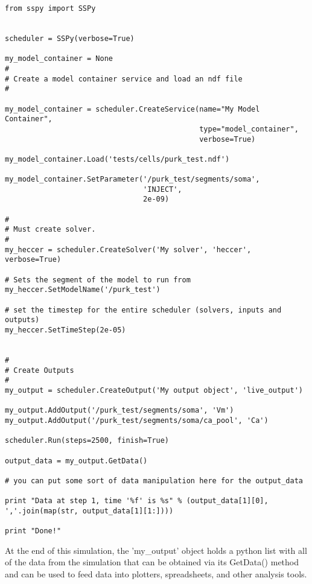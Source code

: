 \documentclass[12pt]{article}
\begin{document}
\begin{verbatim}
from sspy import SSPy 


scheduler = SSPy(verbose=True)

my_model_container = None
#
# Create a model container service and load an ndf file
#
    
my_model_container = scheduler.CreateService(name="My Model Container",
                                             type="model_container",
                                             verbose=True)

my_model_container.Load('tests/cells/purk_test.ndf')

my_model_container.SetParameter('/purk_test/segments/soma',
                                'INJECT',
                                2e-09)

#
# Must create solver.
#
my_heccer = scheduler.CreateSolver('My solver', 'heccer', verbose=True)

# Sets the segment of the model to run from
my_heccer.SetModelName('/purk_test')

# set the timestep for the entire scheduler (solvers, inputs and outputs)
my_heccer.SetTimeStep(2e-05)


#
# Create Outputs
#
my_output = scheduler.CreateOutput('My output object', 'live_output')

my_output.AddOutput('/purk_test/segments/soma', 'Vm')
my_output.AddOutput('/purk_test/segments/soma/ca_pool', 'Ca')

scheduler.Run(steps=2500, finish=True)

output_data = my_output.GetData()

# you can put some sort of data manipulation here for the output_data

print "Data at step 1, time '%f' is %s" % (output_data[1][0], ','.join(map(str, output_data[1][1:])))

print "Done!"
\end{verbatim}

At the end of this simulation, the 'my\_output' object holds a python list with all of the data from the simulation that can be obtained via its GetData() method and can be used to feed data into plotters, spreadsheets, and other analysis tools.
\end{document}
